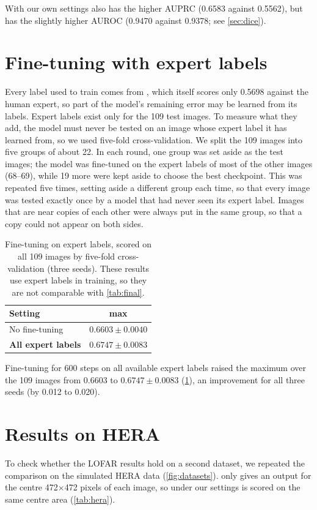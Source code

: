 With our own settings \hybrid{} also has the higher AUPRC (0.6583 against
0.5562), but \tfunet{} has the slightly higher AUROC (0.9470 against 0.9378; see
\cref{sec:dice}).

\section{Fine-tuning with expert labels}
\label{sec:expert_ft}
Every label used to train \hybrid{} comes from \aoflagger{}, which itself
scores only 0.5698 against the human expert, so part of the model's remaining
error may be learned from its labels. Expert labels exist only for the 109
test images. To measure what they add, the model must never be tested on an
image whose expert label it has learned from, so we used five-fold
cross-validation. We split the 109 images into five groups of about 22. In each
round, one group was set aside as the test images; the model was fine-tuned on
the expert labels of most of the other images (68--69), while 19 more were kept
aside to choose the best checkpoint. This was repeated five times, setting aside
a different group each time, so that every image was tested exactly once by a
model that had never seen its expert label. Images that are near copies of each
other were always put in the same group, so that a copy could not appear on
both sides.

\begin{table}[H]
  \centering
  \caption[Fine-tuning with expert labels]{Fine-tuning \hybrid{} on expert labels, scored on all 109 images by
    five-fold cross-validation (three seeds). These results use expert labels
    in training, so they are not comparable with \cref{tab:final}.}
  \label{tab:expert_ft}
  \begin{tabular}{lc}
    \toprule
    Setting & max \Fone{} \\
    \midrule
    No fine-tuning & $0.6603 \pm 0.0040$ \\
    \textbf{All expert labels} & $\mathbf{0.6747 \pm 0.0083}$ \\
    \bottomrule
  \end{tabular}
\end{table}

Fine-tuning for 600 steps on all available expert labels raised the maximum
\Fone{} over the 109 images from 0.6603 to $0.6747 \pm 0.0083$
(\cref{tab:expert_ft}), an improvement for all three seeds (by 0.012 to
0.020).

\section{Results on HERA}
\label{sec:hera_results}
To check whether the LOFAR results hold on a second dataset, we repeated the
comparison on the simulated HERA data (\cref{fig:datasets}).
\tfunet{} only gives an output for the centre 472$\times$472 pixels of each
image, so under our settings \hybrid{} is scored on the same centre area
(\cref{tab:hera}).

